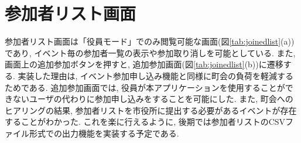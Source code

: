\section{参加者リスト画面}%
参加者リスト画面は「役員モード」でのみ閲覧可能な画面(図\ref{tab:joinedlist}(a))であり, イベント毎の参加者一覧の表示や参加取り消しを可能としている. また, 画面上の追加参加ボタンを押すと, 追加参加画面(図\ref{tab:joinedlist}(b))に遷移する. 実装した理由は, イベント参加申し込み機能と同様に町会の負荷を軽減するためである. 追加参加画面では, 役員が本アプリケーションを使用することができないユーザの代わりに参加申し込みをすることを可能にした. また, 町会へのヒアリングの結果, 参加者リストを市役所に提出する必要があるイベントが存在することがわかった. これを楽に行えるように, 後期では参加者リストのCSVファイル形式での出力機能を実装する予定である.

